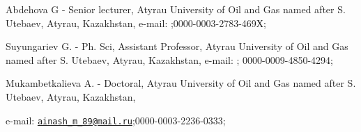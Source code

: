 \begin{authorinfo}
Abdehova G - Senior lecturer, Atyrau Uni󠀁versity of Oil and Gas
nam󠀁ed aft󠀁er S. Ute󠀁baev, Aty󠀁rau, Kaz󠀁akhstan, e-mail:
\href{mailto:gulya6320@mail.ru}{};0000-0003-2783-469Х;

Suyungariev G. - Ph. Sci, Assistant Professor, Atyrau
Uni󠀁versity of Oil and Gas nam󠀁ed aft󠀁er S. Ute󠀁baev, Aty󠀁rau, Kaz󠀁akhstan,
e-mail: \href{mailto:s.gabit72@mail.ru}{};
0000-0009-4850-4294;

Mukambetkalieva A. - Doctoral, Atyrau Uni󠀁versity of Oil and Gas nam󠀁ed
aft󠀁er S. Ute󠀁baev, Aty󠀁rau, Kaz󠀁akhstan,

e-mail: \href{mailto:ainash_m_89@mail.ru}{\nolinkurl{ainash\_m\_89@mail.ru}};0000-0003-2236-0333;\
\end{authorinfo}
